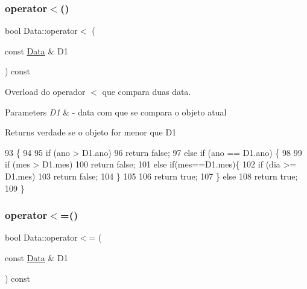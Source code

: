 \subsubsection{\texorpdfstring{operator$<$()}{operator<()}}
{\footnotesize\ttfamily bool Data\+::operator$<$ (\begin{DoxyParamCaption}\item[{const \hyperlink{classData}{Data} \&}]{D1 }\end{DoxyParamCaption}) const}



Overload do operador $<$ que compara duas data. 


\begin{DoxyParams}{Parameters}
{\em D1} & -\/ data com que se compara o objeto atual \\
\hline
\end{DoxyParams}
\begin{DoxyReturn}{Returns}
verdade se o objeto for menor que D1 
\end{DoxyReturn}

\begin{DoxyCode}
93                                          \{
94 
95     \textcolor{keywordflow}{if} (ano > D1.ano)
96         \textcolor{keywordflow}{return} \textcolor{keyword}{false};
97     \textcolor{keywordflow}{else} \textcolor{keywordflow}{if} (ano == D1.ano) \{
98 
99         \textcolor{keywordflow}{if} (mes > D1.mes)
100             \textcolor{keywordflow}{return} \textcolor{keyword}{false};
101         \textcolor{keywordflow}{else} \textcolor{keywordflow}{if}(mes==D1.mes)\{
102             \textcolor{keywordflow}{if} (dia >= D1.mes)
103                 \textcolor{keywordflow}{return} \textcolor{keyword}{false};
104         \}
105 
106         \textcolor{keywordflow}{return} \textcolor{keyword}{true};
107     \} \textcolor{keywordflow}{else}
108         \textcolor{keywordflow}{return} \textcolor{keyword}{true};
109 \}
\end{DoxyCode}
\mbox{\label{classData_a8c3fdab05b3e81bb7b302b1d4d9a9d1f}} 
\subsubsection{\texorpdfstring{operator$<$=()}{operator<=()}}
{\footnotesize\ttfamily bool Data\+::operator$<$= (\begin{DoxyParamCaption}\item[{const \hyperlink{classData}{Data} \&}]{D1 }\end{DoxyParamCaption}) const}



